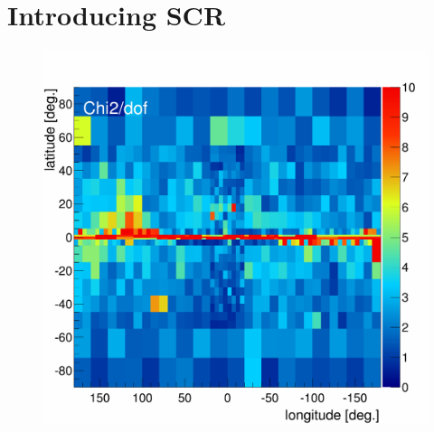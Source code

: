 
\section{Introducing SCR}

\begin{figure}[h]
  \centering
  \begin{minipage}[h]{0.45\textwidth}
  	\centering
	\includegraphics[width=1.\linewidth]{pic/results/SCRonly_Chi2Distribution.png}
  	\label{fig:SCRonly_fit}
  \end{minipage}
  \hfill
  \begin{minipage}[h]{0.45\textwidth}
	  \centering

\end{minipage}
\end{figure}
